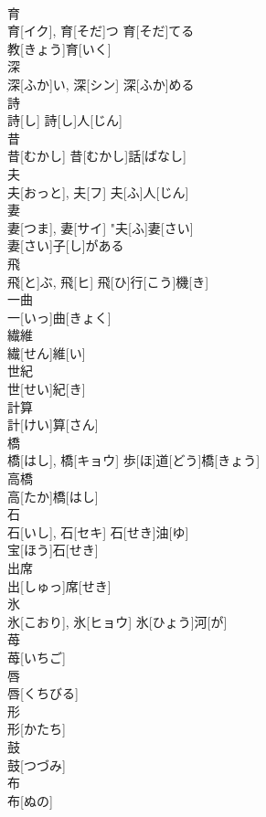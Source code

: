\documentclass[8pt]{extreport}
\begin{document}
\begin{CJK}{UTF8}{min}
\\	育	
\\	育[イク], 育[そだ]つ	育[そだ]てる 
\\	教[きょう]育[いく] 
\\	深	
\\	深[ふか]い, 深[シン]	深[ふか]める 
\\	詩	
\\	詩[し]	詩[し]人[じん] 
\\	昔	
\\	昔[むかし]	昔[むかし]話[ばなし] 
\\	夫	
\\	夫[おっと], 夫[フ]	夫[ふ]人[じん] 
\\	妻	
\\	妻[つま], 妻[サイ]	"夫[ふ]妻[さい] 
\\	妻[さい]子[し]がある 
\\	飛	
\\	飛[と]ぶ, 飛[ヒ]	飛[ひ]行[こう]機[き] 
\\	一曲	
\\	一[いっ]曲[きょく]	
\\	繊維	
\\	繊[せん]維[い]	
\\	世紀	
\\	世[せい]紀[き]	
\\	計算	
\\	計[けい]算[さん]	
\\	橋	
\\	橋[はし], 橋[キョウ]	歩[ほ]道[どう]橋[きょう] 
\\	高橋	
\\	高[たか]橋[はし]	
\\	石	
\\	石[いし], 石[セキ]	石[せき]油[ゆ] 
\\	宝[ほう]石[せき] 
\\	出席	
\\	出[しゅっ]席[せき]	
\\	氷	
\\	氷[こおり], 氷[ヒョウ]	氷[ひょう]河[が] 
\\	苺	
\\	苺[いちご]	
\\	唇	
\\	唇[くちびる]	
\\	形	
\\	形[かたち]	
\\	鼓	
\\	鼓[つづみ]	
\\	布	
\\	布[ぬの]	

\end{CJK}
\end{document}
